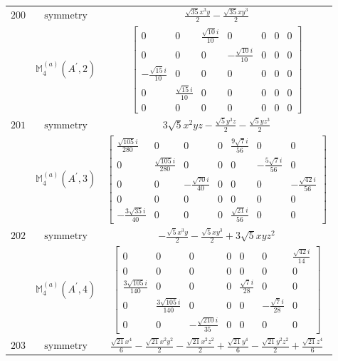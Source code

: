 \documentclass[fleqn,8pt,landscape]{jsarticle}
\begin{document}
\begin{longtable}{ccc}
$ 200 $ & $ \text{symmetry} $ & $ \frac{\sqrt{35} x^{3} y}{2} - \frac{\sqrt{35} x y^{3}}{2} $ \\
$  $ & $ \mathbb{M}_{4}^{(a)}(A^{\prime},2) $ & $ \begin{bmatrix} 0 & 0 & \frac{\sqrt{10} i}{10} & 0 & 0 & 0 & 0 \\ 0 & 0 & 0 & - \frac{\sqrt{10} i}{10} & 0 & 0 & 0 \\ - \frac{\sqrt{15} i}{10} & 0 & 0 & 0 & 0 & 0 & 0 \\ 0 & \frac{\sqrt{15} i}{10} & 0 & 0 & 0 & 0 & 0 \\ 0 & 0 & 0 & 0 & 0 & 0 & 0 \end{bmatrix} $ \\ \hline
$ 201 $ & $ \text{symmetry} $ & $ 3 \sqrt{5} x^{2} y z - \frac{\sqrt{5} y^{3} z}{2} - \frac{\sqrt{5} y z^{3}}{2} $ \\
$  $ & $ \mathbb{M}_{4}^{(a)}(A^{\prime},3) $ & $ \begin{bmatrix} \frac{\sqrt{105} i}{280} & 0 & 0 & 0 & \frac{9 \sqrt{7} i}{56} & 0 & 0 \\ 0 & \frac{\sqrt{105} i}{280} & 0 & 0 & 0 & - \frac{5 \sqrt{7} i}{56} & 0 \\ 0 & 0 & - \frac{\sqrt{70} i}{40} & 0 & 0 & 0 & - \frac{\sqrt{42} i}{56} \\ 0 & 0 & 0 & 0 & 0 & 0 & 0 \\ - \frac{3 \sqrt{35} i}{40} & 0 & 0 & 0 & \frac{\sqrt{21} i}{56} & 0 & 0 \end{bmatrix} $ \\ \hline
$ 202 $ & $ \text{symmetry} $ & $ - \frac{\sqrt{5} x^{3} y}{2} - \frac{\sqrt{5} x y^{3}}{2} + 3 \sqrt{5} x y z^{2} $ \\
$  $ & $ \mathbb{M}_{4}^{(a)}(A^{\prime},4) $ & $ \begin{bmatrix} 0 & 0 & 0 & 0 & 0 & 0 & \frac{\sqrt{42} i}{14} \\ 0 & 0 & 0 & 0 & 0 & 0 & 0 \\ \frac{3 \sqrt{105} i}{140} & 0 & 0 & 0 & \frac{\sqrt{7} i}{28} & 0 & 0 \\ 0 & \frac{3 \sqrt{105} i}{140} & 0 & 0 & 0 & - \frac{\sqrt{7} i}{28} & 0 \\ 0 & 0 & - \frac{\sqrt{210} i}{35} & 0 & 0 & 0 & 0 \end{bmatrix} $ \\ \hline
$ 203 $ & $ \text{symmetry} $ & $ \frac{\sqrt{21} x^{4}}{6} - \frac{\sqrt{21} x^{2} y^{2}}{2} - \frac{\sqrt{21} x^{2} z^{2}}{2} + \frac{\sqrt{21} y^{4}}{6} - \frac{\sqrt{21} y^{2} z^{2}}{2} + \frac{\sqrt{21} z^{4}}{6} $ \\

\end{longtable}
\end{document}
